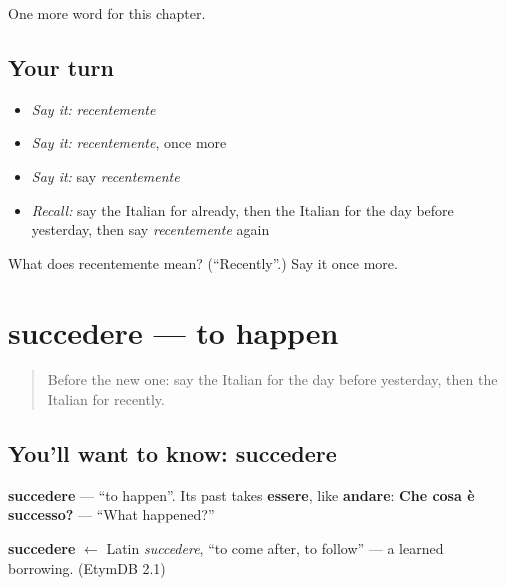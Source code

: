 \begin{grammarlens}[title={What you've built}]
One more word for this chapter.
\end{grammarlens}

\subsection*{Your turn}
\begin{itemize}
\raggedright
  \item \emph{Say it:} \emph{recentemente}
  \item \emph{Say it:} \emph{recentemente}, once more
  \item \emph{Say it:} say \emph{recentemente}
  \item \emph{Recall:} say the Italian for already, then the Italian for the day before yesterday, then say \emph{recentemente} again
\end{itemize}

\begin{tcolorbox}[breakable,colback=teal!4,colframe=teal!35!black,title={Before you move on}]
What does recentemente mean? (\textquotedblleft{}Recently\textquotedblright{}.) Say it once more.
\end{tcolorbox}
\section[succedere]{succedere — to happen}

\label{lesson:IT-C137-succedere}



\begin{quote}
Before the new one: say the Italian for the day before yesterday, then the Italian for recently.
\end{quote}

\subsection*{You'll want to know: succedere}
\textbf{succedere} — \textquotedblleft{}to happen\textquotedblright{}. Its past takes \textbf{essere}, like \textbf{andare}: \textbf{Che cosa è successo?} — \textquotedblleft{}What happened?\textquotedblright{}

\begin{cousinweb}
\textbf{succedere} $\leftarrow$ Latin \emph{succedere}, \textquotedblleft{}to come after, to follow\textquotedblright{} — a learned borrowing. (EtymDB 2.1)
\end{cousinweb}

